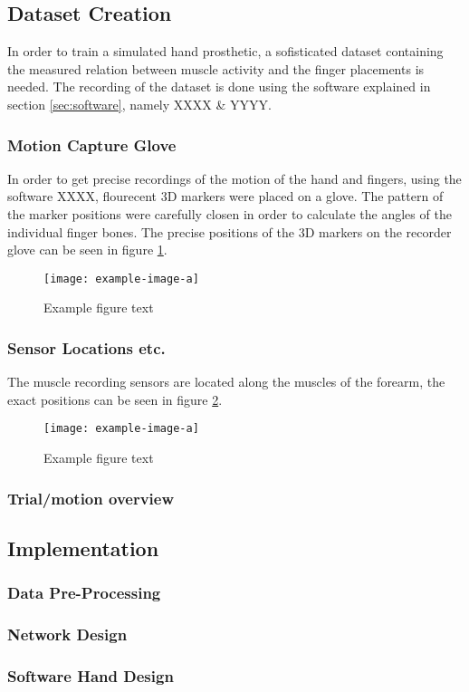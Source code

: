 \documentclass[../main.tex]{subfiles}
\begin{document}
\subsection{Dataset Creation}

In order to train a simulated hand prosthetic, a sofisticated dataset containing the measured relation between muscle activity and the finger placements is needed.
The recording of the dataset is done using the software explained in section \ref{sec:software}, namely XXXX \& YYYY.

\subsubsection{Motion Capture Glove}

In order to get precise recordings of the motion of the hand and fingers, using the software XXXX, flourecent 3D markers were placed on a glove.
The pattern of the marker positions were carefully closen in order to calculate the angles of the individual finger bones.
The precise positions of the 3D markers on the recorder glove can be seen in figure \ref{fig:glove}.

\begin{figure}[h]
\begin{center}
\texttt{[image: example-image-a]}
\caption{Example figure text}
\label{fig:glove}
\end{center}
\end{figure}

\subsubsection{Sensor Locations etc.}

The muscle recording sensors are located along the muscles of the forearm, the exact positions can be seen in figure \ref{fig:musclesensors}.

\begin{figure}[h]
\begin{center}
\texttt{[image: example-image-a]}
\caption{Example figure text}
\label{fig:musclesensors}
\end{center}
\end{figure}




\subsubsection{Trial/motion overview}

\subsection{Implementation}
\subsubsection{Data Pre-Processing}
\subsubsection{Network Design}
\subsubsection{Software Hand Design}
\end{document}
